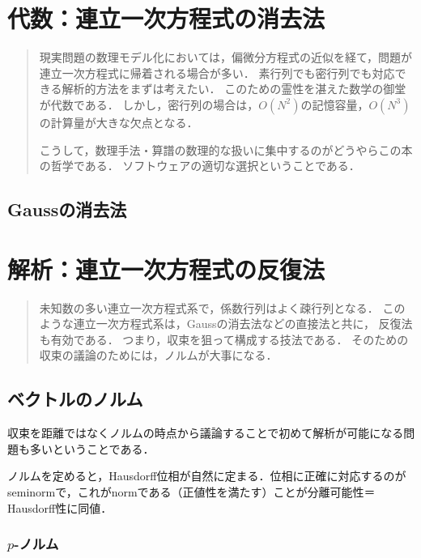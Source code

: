 \documentclass[uplatex, dvipdfmx]{jsreport}
\begin{document}
\chapter{代数：連立一次方程式の消去法}

\begin{quotation}
    現実問題の数理モデル化においては，偏微分方程式の近似を経て，問題が連立一次方程式に帰着される場合が多い．
    素行列でも密行列でも対応できる解析的方法をまずは考えたい．
    このための霊性を湛えた数学の御堂が代数である．
    しかし，密行列の場合は，$O(N^2)$の記憶容量，$O(N^3)$の計算量が大きな欠点となる．

    こうして，数理手法・算譜の数理的な扱いに集中するのがどうやらこの本の哲学である．
    ソフトウェアの適切な選択ということである．
\end{quotation}


\section{Gaussの消去法}


\chapter{解析：連立一次方程式の反復法}

\begin{quotation}
    未知数の多い連立一次方程式系で，係数行列はよく疎行列となる．
    このような連立一次方程式系は，Gaussの消去法などの直接法と共に，
    反復法も有効である．
    つまり，収束を狙って構成する技法である．
    そのための収束の議論のためには，ノルムが大事になる．
\end{quotation}

\section{ベクトルのノルム}

\begin{tcolorbox}[colframe=ForestGreen, colback=ForestGreen!10!white,breakable,colbacktitle=ForestGreen!40!white,coltitle=black,fonttitle=\bfseries\sffamily,
title=]
    収束を距離ではなくノルムの時点から議論することで初めて解析が可能になる問題も多いということである．

    ノルムを定めると，Hausdorff位相が自然に定まる．位相に正確に対応するのがseminormで，これがnormである（正値性を満たす）ことが分離可能性＝Hausdorff性に同値．
\end{tcolorbox}

\subsection{$p$-ノルム}
\end{document}

